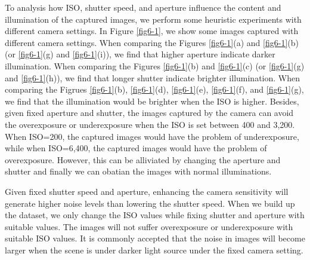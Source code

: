 To analysis how ISO, shutter speed, and aperture influence the content and illumination of the captured images, we perform some heuristic experiments with different camera settings. In Figure \ref{fig6-1}, we show some images captured with different camera settings. When comparing the Figures \ref{fig6-1}(a) and \ref{fig6-1}(b) (or \ref{fig6-1}(g) and \ref{fig6-1}(i)), we find that higher aperture indicate darker illumination. When comparing the Figures \ref{fig6-1}(b) and \ref{fig6-1}(c) (or \ref{fig6-1}(g) and \ref{fig6-1}(h)), we find that longer shutter indicate brighter illumination. When comparing the Figrues \ref{fig6-1}(b), \ref{fig6-1}(d), \ref{fig6-1}(e), \ref{fig6-1}(f), and \ref{fig6-1}(g), we find that the illumination would be brighter when the ISO is higher. Besides, given fixed aperture and shutter, the images captured by the camera can avoid the overexposure or underexposure when the ISO is set between 400 and 3,200.  When ISO=200, the captured images would have the problem of underexposure, while when ISO=6,400, the captured images would have the problem of overexposure. However, this can be alliviated by changing the aperture and shutter and finally we can obatian the images with normal illuminations.

Given fixed shutter speed and aperture, enhancing the camera sensitivity will generate higher noise levels than lowering the shutter speed. When we build up the dataset, we only change the ISO values while fixing shutter and aperture with suitable values. The images will not suffer overexposure or underexposure with suitable ISO values. It is commonly accepted that the noise in images will become larger when the scene is under darker light source under the fixed camera setting.



